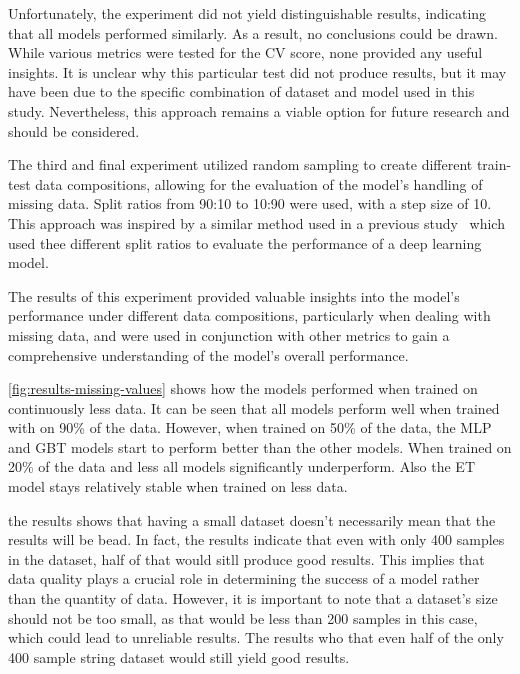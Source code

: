 Unfortunately, the experiment did not yield distinguishable results, indicating that all models performed similarly.
As a result, no conclusions could be drawn. While various metrics were tested for the CV score, none provided any
useful insights.
It is unclear why this particular test did not produce results, but it may have been due to the specific combination
of dataset and model used in this study.
Nevertheless, this approach remains a viable option for future research and should be considered.

The third and final experiment utilized random sampling to create different train-test data compositions, allowing
for the evaluation of the model's handling of missing data.
Split ratios from 90:10 to 10:90 were used, with a step size of 10.
This approach was inspired by a similar method used in a previous study~\cite[p. 570--574]{liu2021deep}  which used
thee different split ratios to evaluate the performance of a deep learning model.

The results of this experiment provided valuable insights into the model's performance under
different data compositions, particularly when dealing with missing
data, and were used in conjunction with other metrics to gain a comprehensive understanding of
the model's overall performance.

\cref{fig:results-missing-values} shows how the models performed when trained on
continuously less data.
It can be seen that all models perform well when trained with on 90\% of the data.
However, when trained on 50\% of the data, the \ac{MLP}  and \ac{GBT} models start to perform
better than the other models.
When trained on 20\% of the data and less all models significantly underperform.
Also the \ac{ET} model stays relatively stable when trained on less data.

the results shows that having a small dataset doesn't necessarily mean that the results will be bead.
In fact, the results indicate that even with only 400 samples in the dataset, half of that would sitll produce good
results.
This implies that data quality plays a crucial role in determining the success of a model rather than the quantity of
data.
However, it is important to note that a dataset's size should not be too small, as that would be less than 200
samples in this case, which could lead to unreliable results.
The results who that even half of the only 400 sample string dataset would still yield good results.

